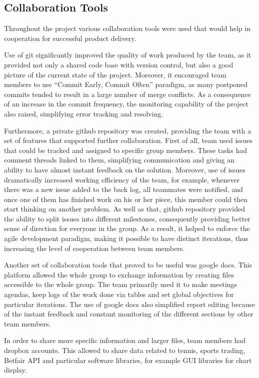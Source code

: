 \documentclass[10pt]{article}
\begin{document}
\subsection{Collaboration Tools}

Throughout the project various collaboration tools were used that would help in cooperation for successful product delivery.

Use of git significantly improved the quality of work produced by the team, as it provided not only a shared code base with version control, but also a good picture of the current state of the project. Moreover, it encouraged team members to use “Commit Early, Commit Often” paradigm, as many postponed commits tended to result in a large number of merge conflicts. As a consequence of an increase in the commit frequency, the monitoring capability of the project also raised, simplifying error tracking and resolving.

Furthermore, a private github repository was created, providing the team with a set of features that supported further collaboration. First of all, team used issues that could be tracked and assigned to specific group members. These tasks had comment threads linked to them, simplifying communication and giving an ability to have almost instant feedback on the solution. Moreover, use of issues dramatically increased working efficiency of the team, for example, whenever there was a new issue added to the back log, all teammates were notified, and once one of them has finished work on his or her piece, this member could then start thinking on another problem. As well as that, github repository provided the ability to split issues into different milestones, consequently providing better sense of direction for everyone in the group. As a result, it helped to enforce the agile development paradigm, making it possible to have distinct iterations, thus increasing the level of cooperation between team members.

Another set of collaboration tools that proved to be useful was google docs. This platform allowed the whole group to exchange information by creating files accessible to the whole group. The team primarily used it to make meetings agendas, keep logs of the work done via tables and set global objectives for particular iterations. The use of google docs also simplified report editing because of the instant feedback and constant monitoring of the different sections by other team members.

In order to share more specific information and larger files, team members had dropbox accounts. This allowed to share data related to tennis, sports trading, Betfair API and particular software libraries, for example GUI libraries for chart display.
\end{document}
